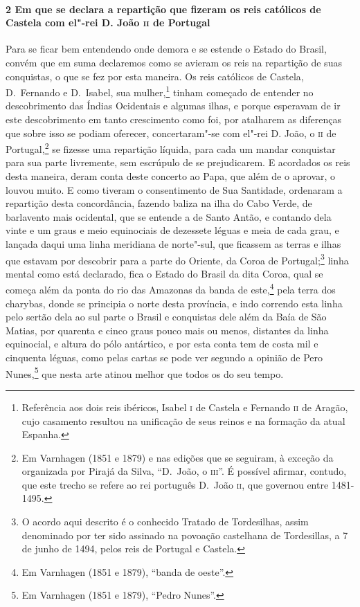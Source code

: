 \begin{linenumbers}
\paragraph{2 Em que se declara a repartição que fizeram os reis católicos de Castela com
el"-rei D. João \textsc{ii} de Portugal} \quad
Para se ficar bem entendendo onde demora e se estende o Estado do Brasil, convém que em
suma declaremos como se avieram os reis na repartição de suas conquistas, o que se fez por
esta maneira. Os reis católicos de Castela, D.~Fernando e D.~Isabel, sua mulher,\footnote{
Referência aos dois reis ibéricos, Isabel \textsc{i} de Castela e Fernando \textsc{ii} de
Aragão, cujo casamento resultou na unificação de seus reinos e na formação da atual
Espanha.} tinham começado de entender no descobrimento das Índias Ocidentais e algumas
ilhas, e porque esperavam de ir este descobrimento em tanto crescimento como foi, por
atalharem as diferenças que sobre isso se podiam oferecer, concertaram"-se com el"-rei D.
João, o \textsc{ii} de Portugal,\footnote{ Em Varnhagen (1851 e 1879) e nas edições que se
seguiram, à exceção da organizada por Pirajá da Silva, ``D.~João, o \textsc{iii}''. É
possível afirmar, contudo, que este trecho se refere ao rei português D.~João \textsc{ii},
que governou entre 1481-1495.} se fizesse uma repartição líquida, para cada um mandar
conquistar para sua parte livremente, sem escrúpulo de se prejudicarem. E acordados os
reis desta maneira, deram conta deste concerto ao Papa, que além de o aprovar, o louvou
muito. E como tiveram o consentimento de Sua Santidade, ordenaram a repartição desta
concordância, fazendo baliza na ilha do Cabo Verde, de barlavento mais ocidental, que se
entende a de Santo Antão, e contando dela vinte e um graus e meio equinociais de dezessete
léguas e meia de cada grau, e lançada daqui uma linha meridiana de norte"-sul, que ficassem
as terras e ilhas que estavam por descobrir para a parte do Oriente, da Coroa de
Portugal;\footnote{ O acordo aqui descrito é o conhecido Tratado de Tordesilhas, assim
denominado por ter sido assinado na povoação castelhana de Tordesillas, a 7 de junho de
1494, pelos reis de Portugal e Castela.} linha mental como está declarado, fica o Estado
do Brasil da dita Coroa, qual se começa além da ponta do rio das Amazonas da banda de
este,\footnote{ Em Varnhagen (1851 e 1879), ``banda de oeste''.} pela terra dos charybas, donde se principia o norte desta província, e indo
correndo esta linha pelo sertão dela ao sul parte o Brasil e conquistas dele além da Baía
de São Matias, por quarenta e cinco graus pouco mais ou menos, distantes da linha
equinocial, e altura do pólo antártico, e por esta conta tem de costa mil e cinquenta
léguas, como pelas cartas se pode ver segundo a opinião de Pero Nunes,\footnote{ Em
Varnhagen (1851 e 1879), ``Pedro Nunes''.} que nesta arte atinou melhor que todos os do
seu tempo.


\end{linenumbers}
